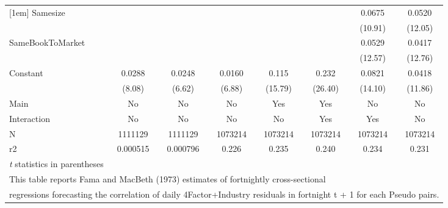 {\begin{tabular}{l*{7}{c}}
[1em]
Samesize            &                     &                     &                     &                     &                     &      0.0675\sym{***}&      0.0520\sym{***}\\
                    &                     &                     &                     &                     &                     &     (10.91)         &     (12.05)         \\
[1em]
SameBookToMarket    &                     &                     &                     &                     &                     &      0.0529\sym{***}&      0.0417\sym{***}\\
                    &                     &                     &                     &                     &                     &     (12.57)         &     (12.76)         \\
[1em]
Constant            &      0.0288\sym{***}&      0.0248\sym{***}&      0.0160\sym{***}&       0.115\sym{***}&       0.232\sym{***}&      0.0821\sym{***}&      0.0418\sym{***}\\
                    &      (8.08)         &      (6.62)         &      (6.88)         &     (15.79)         &     (26.40)         &     (14.10)         &     (11.86)         \\
\hline
Main                &          No         &          No         &          No         &         Yes         &         Yes         &          No         &          No         \\
Interaction         &          No         &          No         &          No         &          No         &         Yes         &         Yes         &          No         \\
N                   &     1111129         &     1111129         &     1073214         &     1073214         &     1073214         &     1073214         &     1073214         \\
r2                  &    0.000515         &    0.000796         &       0.226         &       0.235         &       0.240         &       0.234         &       0.231         \\
\hline\hline
\multicolumn{8}{l}{\footnotesize \textit{t} statistics in parentheses}\\
\multicolumn{8}{l}{\footnotesize This table reports Fama and MacBeth (1973) estimates of fortnightly cross-sectional}\\
\multicolumn{8}{l}{\footnotesize  regressions forecasting the correlation of daily 4Factor+Industry residuals in fortnight t + 1 for each Pseudo pairs.}\\

\end{tabular}}
